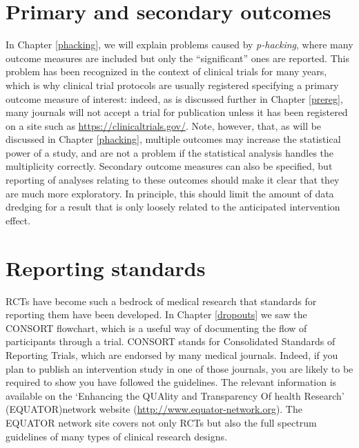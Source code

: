 \documentclass{krantz}
\begin{document}
\hypertarget{primary-and-secondary-outcomes}{%
\section{Primary and secondary outcomes}\label{primary-and-secondary-outcomes}}

In Chapter \ref{phacking}, we will explain problems caused by \emph{p-hacking}, where many outcome measures are included but only the ``significant'' ones are reported. This problem has been recognized in the context of clinical trials for many years, which is why clinical trial protocols are usually registered specifying a primary outcome measure of interest: indeed, as is discussed further in Chapter \ref{prereg}, many journals will not accept a trial for publication unless it has been registered on a site such as \url{https://clinicaltrials.gov/}. Note, however, that, as will be discussed in Chapter \ref{phacking}, multiple outcomes may increase the statistical power of a study, and are not a problem if the statistical analysis handles the multiplicity correctly. Secondary outcome measures can also be specified, but reporting of analyses relating to these outcomes should make it clear that they are much more exploratory. In principle, this should limit the amount of data dredging for a result that is only loosely related to the anticipated intervention effect.

\hypertarget{reporting-standards}{%
\section{Reporting standards}\label{reporting-standards}}

RCTs have become such a bedrock of medical research that standards for reporting them have been developed. In Chapter \ref{dropouts} we saw the CONSORT flowchart, which is a useful way of documenting the flow of participants through a trial. CONSORT stands for Consolidated Standards of Reporting Trials, which are endorsed by many medical journals. Indeed, if you plan to publish an intervention study in one of those journals, you are likely to be required to show you have followed the guidelines. The relevant information is available on the `Enhancing the QUAlity and Transparency Of health Research' (EQUATOR)network website (\url{http://www.equator-network.org}). The EQUATOR network site covers not only RCTs but also the full spectrum guidelines of many types of clinical research designs.
\end{document}
